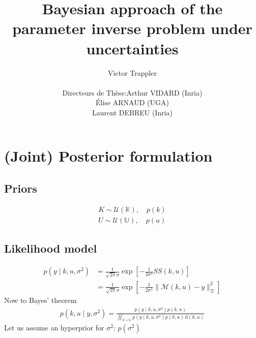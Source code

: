 \documentclass[a4paper,11pt]{article}
\begin{document}
\title{Bayesian approach of the parameter inverse problem under uncertainties}

\author{Victor Trappler \\[1cm]
  \begin{tabular}{lr}
    Directeurs de Thèse: & Arthur VIDARD (Inria) \\
                        & Élise ARNAUD (UGA)\\
                        & Laurent DEBREU (Inria)
  \end{tabular}
}

\maketitle
\tableofcontents
\section{(Joint) Posterior formulation}
\subsection{Priors}
\begin{align*}
  K \sim \mathcal{U}(\mathbb{K}), \quad p(k) \\
  U \sim \mathcal{U}(\mathbb{U}), \quad p(u)
\end{align*}
\subsection{Likelihood model}
\begin{align*}
  p(y \mid k, u, \sigma^2) &= \frac{1}{\sqrt{2\pi}\sigma}\exp\left[-\frac{1}{2\sigma^2}SS(k,u)\right] \\
                         &= \frac{1}{\sqrt{2\pi}\sigma}\exp\left[-\frac{1}{2\sigma^2} \|\mathcal{M}(k,u) - y \|^2_{\Sigma}\right]
\end{align*}
Now to Bayes' theorem
\begin{align*}
  p(k,u \mid y,\sigma^2) = \frac{p(y \mid k, u, \sigma^2) p(k,u)}{\iint_{\mathbb{K}\times\mathbb{U}}p(y \mid k, u, \sigma^2) p(k,u) \, \mathrm{d}(k,u)}
\end{align*}
Let us assume an hyperprior for $\sigma^2$: $p(\sigma^2)$
\end{document}
